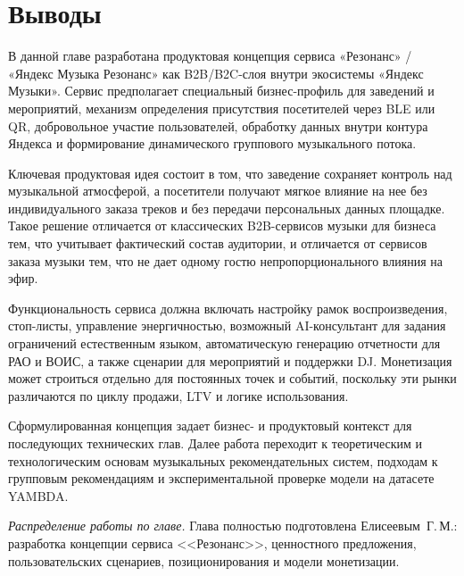 \section{Выводы}
\label{sec:service:conclusion}

В данной главе разработана продуктовая концепция сервиса «Резонанс» / «Яндекс Музыка Резонанс» как B2B/B2C-слоя внутри экосистемы «Яндекс Музыки». Сервис предполагает специальный бизнес-профиль для заведений и мероприятий, механизм определения присутствия посетителей через BLE или QR, добровольное участие пользователей, обработку данных внутри контура Яндекса и формирование динамического группового музыкального потока.

Ключевая продуктовая идея состоит в том, что заведение сохраняет контроль над музыкальной атмосферой, а посетители получают мягкое влияние на нее без индивидуального заказа треков и без передачи персональных данных площадке. Такое решение отличается от классических B2B-сервисов музыки для бизнеса тем, что учитывает фактический состав аудитории, и отличается от сервисов заказа музыки тем, что не дает одному гостю непропорционального влияния на эфир.

Функциональность сервиса должна включать настройку рамок воспроизведения, стоп-листы, управление энергичностью, возможный AI-консультант для задания ограничений естественным языком, автоматическую генерацию отчетности для РАО и ВОИС, а также сценарии для мероприятий и поддержки DJ. Монетизация может строиться отдельно для постоянных точек и событий, поскольку эти рынки различаются по циклу продажи, LTV и логике использования.

Сформулированная концепция задает бизнес- и продуктовый контекст для последующих технических глав. Далее работа переходит к теоретическим и технологическим основам музыкальных рекомендательных систем, подходам к групповым рекомендациям и экспериментальной проверке модели на датасете YAMBDA.

\textit{Распределение работы по главе.} Глава полностью подготовлена Елисеевым~Г.\,М.: разработка концепции сервиса <<Резонанс>>, ценностного предложения, пользовательских сценариев, позиционирования и модели монетизации.
